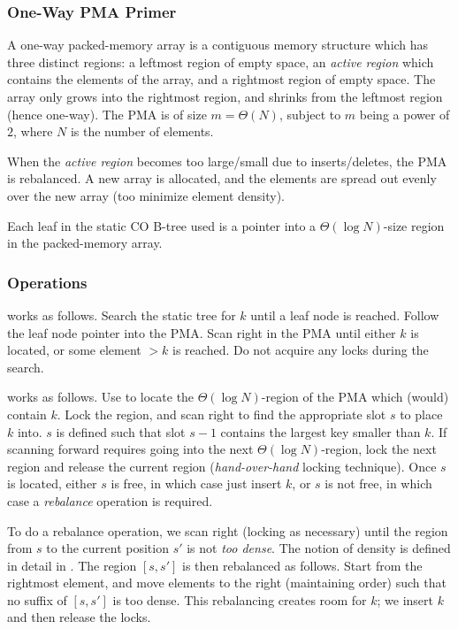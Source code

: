 \documentclass{style}
\begin{document}
\subsubsection{One-Way PMA Primer}

A one-way packed-memory array is a contiguous memory structure which has three
distinct regions: a leftmost region of empty space, an \textit{active region}
which contains the elements of the array, and a rightmost region of empty
space. The array only grows into the rightmost region, and shrinks from the
leftmost region (hence one-way).  The PMA is of size $m = \Theta(N)$, subject
to $m$ being a power of $2$, where $N$ is the number of elements.

When the \textit{active region} becomes too large/small due to inserts/deletes,
the PMA is rebalanced. A new array is allocated, and the elements are
spread out evenly over the new array (too minimize element density).

Each leaf in the static CO B-tree used is a pointer into a $\Theta(\log
N)$-size region in the packed-memory array. 

\subsubsection{Operations}

\Search{} works as follows. Search the static tree for $k$ until
a leaf node is reached. Follow the leaf node pointer into the PMA.
Scan right in the PMA until either $k$ is located, or some element
$> k$ is reached. Do not acquire any locks during the search.

\Insert{} works as follows. Use \Search{} to locate the $\Theta(\log N)$-region
of the PMA which (would) contain $k$. Lock the region, and scan right to find
the appropriate slot $s$ to place $k$ into. $s$ is defined such that slot $s -
1$ contains the largest key smaller than $k$. If scanning forward requires
going into the next $\Theta(\log N)$-region, lock the next region and release
the current region (\textit{hand-over-hand} locking technique). Once $s$
is located, either $s$ is free, in which case just insert $k$, or $s$ is not free,
in which case a \textit{rebalance} operation is required.

To do a rebalance operation, we scan right (locking as necessary) until the
region from $s$ to the current position $s'$ is not \textit{too dense}. The
notion of density is defined in detail in \cite{BenderFiGi05}. The region
$[s, s']$ is then rebalanced as follows. Start from the rightmost element,
and move elements to the right (maintaining order) such that no suffix of
$[s, s']$ is too dense. This rebalancing creates room for $k$; we insert $k$
and then release the locks.
\end{document}
